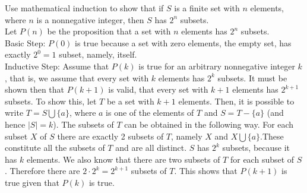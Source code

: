 \documentclass[12pt]{article}
\begin{document}
\begin{example} Use mathematical induction to show that if $S$ is a finite set with $n$ elements, where $n$ is a nonnegative integer, then $S$ has $2^n$ subsets. \\ Let $P(n)$ be the proposition that a set with $n$ elements has $2^n$ subsets. \\ 
Basic Step: $P(0)$ is true because a set with zero elements, the empty set, has exactly $2^0 = 1$ subset, namely, itself. \\
Inductive Step: Assume that $P(k)$ is true for an arbitrary nonnegative integer $k$, that is, we assume that every set with $k$ elements has $2^k$ subsets. It must be shown then that $P(k + 1)$ is valid, that every set with $k + 1$ elements has $2^{k + 1}$ subsets. To show this, let $T$ be a set with $k + 1$ elements. Then, it is possible to write $T = S \bigcup \{a\}$, where $a$ is one of the elements of $T$ and $S = T - \{a\}$ (and hence $|S| = k$). The subsets of $T$ can be obtained in the following way. For each subset $X$ of $S$ there are exactly 2 subsets of $T$, namely $X$ and $X \bigcup \{a\}$.These constitute all the subsets of $T$ and are all distinct. $S$ has $2^k$ subsets, because it has $k$ elements. We also know that there are two subsets of $T$ for each subset of $S$. Therefore there are $2 \cdot 2^k = 2^{k + 1}$ subsets of $T$. This shows that $P(k + 1)$ is true given that $P(k)$ is true. \end{example} 
\end{document}

